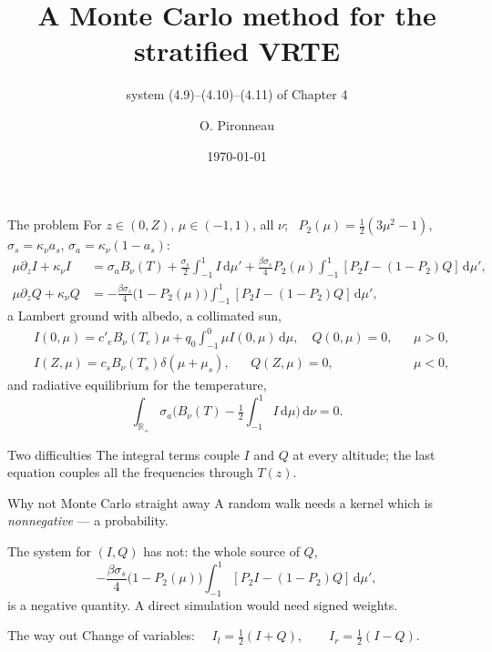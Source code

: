 \documentclass[aspectratio=169,10pt]{beamer}
\title[Monte Carlo for the VRTE]{A Monte Carlo method for the stratified VRTE}
\subtitle{system (4.9)--(4.10)--(4.11) of Chapter 4}
\author{O. Pironneau}
\date{\today}
\renewcommand{\d}{\,\mathrm{d}}
\begin{document}
\begin{frame}\titlepage\end{frame}

\begin{frame}{The problem}
\small
For $z\in(0,Z)$, $\mu\in(-1,1)$, all $\nu$; \ $P_2(\mu)=\frac12(3\mu^2-1)$,
$\sigma_s=\kappa_\nu a_s$, $\sigma_a=\kappa_\nu(1-a_s)$:
{\footnotesize
\begin{align*}
\mu\partial_z I+\kappa_\nu I&=\sigma_aB_\nu(T)+\frac{\sigma_s}2\int_{-1}^1 I\d\mu'
+\frac{\beta\sigma_s}4P_2(\mu)\int_{-1}^1[P_2I-(1-P_2)Q]\d\mu',\\
\mu\partial_z Q+\kappa_\nu Q&=-\frac{\beta\sigma_s}4\big(1-P_2(\mu)\big)\int_{-1}^1[P_2I-(1-P_2)Q]\d\mu',
\end{align*}}%
a Lambert ground with albedo, a collimated sun,
{\footnotesize
\begin{align*}
&I(0,\mu)=c'_eB_\nu(T_e)\mu+q_0\int_{-1}^0\mu I(0,\mu)\d\mu,\quad Q(0,\mu)=0,&&\mu>0,\\
&I(Z,\mu)=c_sB_\nu(T_s)\delta(\mu+\mu_s),\quad\ \ \, Q(Z,\mu)=0,&&\mu<0,
\end{align*}}%
and radiative equilibrium for the temperature,
\[
\int_{\mathbb{R}_+}\sigma_a\Big(B_\nu(T)-\tfrac12\int_{-1}^1I\d\mu\Big)\d\nu=0 .
\]
\begin{block}{Two difficulties}
The integral terms couple $I$ and $Q$ at every altitude; the last equation couples all the
frequencies through $T(z)$.
\end{block}
\end{frame}

\begin{frame}{Why not Monte Carlo straight away}
A random walk needs a kernel which is \emph{nonnegative} --- a probability.
\medskip

The system for $(I,Q)$ has not: the whole source of $Q$,
\[
-\frac{\beta\sigma_s}4\big(1-P_2(\mu)\big)\int_{-1}^1[P_2I-(1-P_2)Q]\d\mu' ,
\]
is a negative quantity. A direct simulation would need signed weights.
\medskip

\begin{block}{The way out}
Change of variables: $\quad I_l=\tfrac12(I+Q),\qquad I_r=\tfrac12(I-Q)$.
\end{block}
\end{frame}
\end{document}
